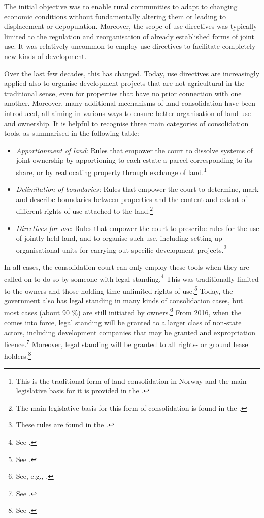 The initial objective was to enable rural communities to adapt to changing economic conditions without fundamentally altering them or leading to displacement or depopulation. Moreover, the scope of use directives was typically limited to the regulation and reorganisation of already established forms of joint use. It was relatively uncommon to employ use directives to facilitate completely new kinds of development.

Over the last few decades, this has changed. Today, use directives are increasingly applied also to organise development projects that are not agricultural in the traditional sense, even for properties that have no prior connection with one another. Moreover, many additional mechanisms of land consolidation have been introduced, all aiming in various ways to ensure better organisation of land use and ownership. It is helpful to recognise three main categories of consolidation tools, as summarised in the following table:

\begin{itemize}
\item \emph{Apportionment of land}: Rules that empower the court to dissolve systems of joint ownership by apportioning to each estate a parcel corresponding to its share, or by reallocating property through exchange of land.\footnote{This is the traditional form of land consolidation in Norway and the main legislative basis for it is provided in the \cite[2 a)-b)]{lca79}.}
\item \emph{Delimitation of boundaries:} Rules that empower the court to determine, mark and describe boundaries between properties and the content and extent of different rights of use attached to the land.\footnote{The main legislative basis for this form of consolidation is found in the \cite[88]{lca79}.}
\item \emph{Directives for use}: Rules that empower the court to prescribe rules for the use of jointly held land, and to organise such use, including setting up organisational units for carrying out specific development projects.\footnote{These rules are found in the \cite[2 c)|34-35]{lca79}.}
\end{itemize}

In all cases, the consolidation court can only employ these tools when they are called on to do so by someone with legal standing.\footnote{See \cite[5]{lca79}.} This was traditionally limited to the owners and those holding time-unlimited rights of use.\footnote{See \cite[5]{lca79}.} Today, the government also has legal standing in many kinds of consolidation cases, but most cases (about 90 \%) are still initiated by owners.\footnote{See, e.g., \cite[135]{bjerva12}.} From 2016, when the \cite{lca13} comes into force, legal standing will be granted to a larger class of non-state actors, including development companies that may be granted and expropriation licence.\footnote{See \cite[1-5(3)]{lca13}.} Moreover, legal standing will be granted to all rights- or ground lease holders.\footnote{See \cite[1-5(1)]{lca13}.}

